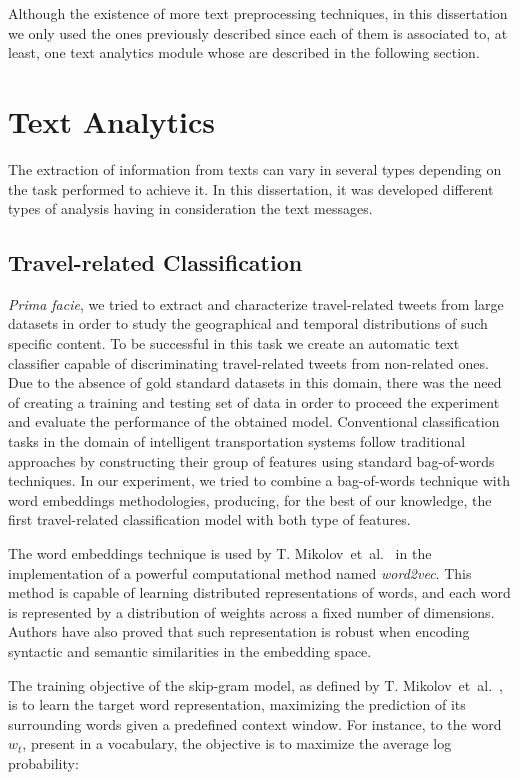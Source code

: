 Although the existence of more text preprocessing techniques, in this dissertation we only used the ones previously described since each of them is associated to, at least, one text analytics module whose are described in the following section.

\section{Text Analytics}
The extraction of information from texts can vary in several types depending on the task performed to achieve it. In this dissertation, it was developed different types of analysis having in consideration the text messages.

\subsection{Travel-related Classification}\label{sec:travel_classification}

\emph{Prima facie}, we tried to extract and characterize travel-related tweets from large datasets in order to study the geographical and temporal distributions of such specific content. To be successful in this task we create an automatic text classifier capable of discriminating travel-related tweets from non-related ones. Due to the absence of gold standard datasets in this domain, there was the need of creating a training and testing set of data in order to proceed the experiment and evaluate the performance of the obtained model. Conventional classification tasks in the domain of intelligent transportation systems follow traditional approaches by constructing their group of features using standard bag-of-words techniques. In our experiment, we tried to combine a bag-of-words technique with word embeddings methodologies, producing, for the best of our knowledge, the first travel-related classification model with both type of features.

The word embeddings technique is used by T. Mikolov~et~al.~\cite{mikolov2013efficient} in the implementation of a powerful computational method named \emph{word2vec}. This method is capable of learning distributed representations of words, and each word is represented by a distribution of weights across a fixed number of dimensions. Authors have also proved that such representation is robust when encoding syntactic and semantic similarities in the embedding space.

The training objective of the skip-gram model, as defined by T. Mikolov~et~al.~\cite{mikolov2013linguistic}, is to learn the target word representation, maximizing the prediction of its surrounding words given a predefined context window. For instance, to the word $w_t$, present in a vocabulary, the objective is to maximize the average log probability:

